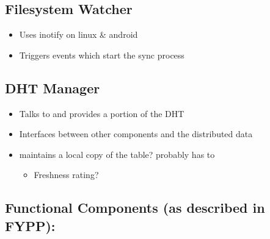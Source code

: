 \documentclass[12pt,a4paper,]{book}
\begin{document}
\subsection{Filesystem Watcher}\label{filesystem-watcher}

\begin{itemize}
\itemsep1pt\parskip0pt
\item
  Uses inotify on linux \& android
\item
  Triggers events which start the sync process
\end{itemize}

\subsection{DHT Manager}\label{dht-manager}

\begin{itemize}
\itemsep1pt\parskip0pt
\item
  Talks to and provides a portion of the DHT
\item
  Interfaces between other components and the distributed data
\item
  maintains a local copy of the table? probably has to

  \begin{itemize}
  \itemsep1pt\parskip0pt
  \item
    Freshness rating?
  \end{itemize}
\end{itemize}

\subsection{Functional Components (as described in
FYPP):}\label{functional-components-as-described-in-fypp}
\end{document}
